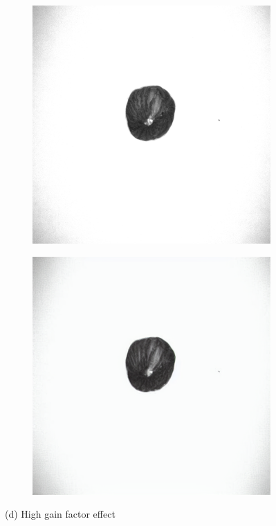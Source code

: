 \documentclass[12pt,DIV14,BCOR12mm,a4paper,footinclude=false,headinclude,parskip=half-,twoside,openright,cleardoublepage=empty,toc=index,bibliography=totoc,listof=totoc]{scrreprt}
\numberwithin{equation}{chapter}
\begin{document}
\begin{figure}\ContinuedFloat
    \centering

    \begin{subfigure}[t]{0.45\textwidth}
        \centering
        \includegraphics[width=\textwidth]{../media/diff_nuts_high_real.png}
    \end{subfigure}%
    \hspace{0.02\textwidth}%
    \begin{subfigure}[t]{0.45\textwidth}
        \centering
        \includegraphics[width=\textwidth]{../media/diff_nuts_high_fake.png}
    \end{subfigure}
    \caption*{(d) High gain factor effect}


\end{figure}
\end{document}
